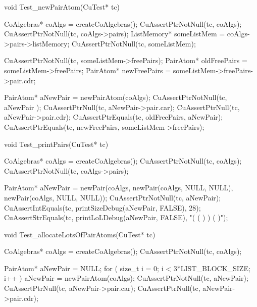 void Test_newPairAtom(CuTest* tc) {
  CoAlgebras* coAlgs = createCoAlgebras();
  CuAssertPtrNotNull(tc, coAlgs);
  CuAssertPtrNotNull(tc, coAlgs->pairs);
  ListMemory* someListMem = coAlgs->pairs->listMemory;
  CuAssertPtrNotNull(tc, someListMem);

  CuAssertPtrNotNull(tc, someListMem->freePairs);
  PairAtom* oldFreePairs = someListMem->freePairs;
  PairAtom* newFreePairs = someListMem->freePairs->pair.cdr;

  PairAtom* aNewPair = newPairAtom(coAlgs);
  CuAssertPtrNotNull(tc, aNewPair );
  CuAssertPtrNull(tc, aNewPair->pair.car);
  CuAssertPtrNull(tc, aNewPair->pair.cdr);
  CuAssertPtrEquals(tc, oldFreePairs, aNewPair);
  CuAssertPtrEquals(tc, newFreePairs, someListMem->freePairs);
}

void Test_printPairs(CuTest* tc) {
  CoAlgebras* coAlgs = createCoAlgebras();
  CuAssertPtrNotNull(tc, coAlgs);
  CuAssertPtrNotNull(tc, coAlgs->pairs);

  PairAtom* aNewPair = newPair(coAlgs,
                               newPair(coAlgs, NULL, NULL),
                               newPair(coAlgs, NULL, NULL));
  CuAssertPtrNotNull(tc, aNewPair);
  CuAssertIntEquals(tc, printSizeDebug(aNewPair, FALSE), 28);
  CuAssertStrEquals(tc, printLoLDebug(aNewPair, FALSE), "( ( ) ) ( )");
}

void Test_allocateLotsOfPairAtoms(CuTest* tc) {
  CoAlgebras* coAlgs = createCoAlgebras();
  CuAssertPtrNotNull(tc, coAlgs);

  PairAtom* aNewPair = NULL;
  for ( size_t i = 0; i < 3*LIST_BLOCK_SIZE; i++ ) {
    aNewPair = newPairAtom(coAlgs);
  }
  CuAssertPtrNotNull(tc, aNewPair);
  CuAssertPtrNull(tc, aNewPair->pair.car);
  CuAssertPtrNull(tc, aNewPair->pair.cdr);
}
\stoptyping

